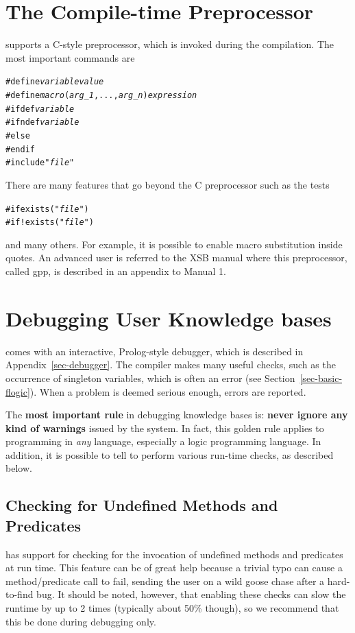 \documentclass[11pt]{article}
\newcommand{\ERGO}{\mbox{\smaller{\ensuremath{\cal{E}}\smaller{{\sc{RGO}}}}}\xspace}
\newcommand{\FLSYSTEM}{\ERGO}
\begin{document}
\section{The Compile-time Preprocessor}\label{sec-gpp}

\FLSYSTEM supports a C-style preprocessor, which is invoked during the
compilation. The most important commands are
\begin{alltt}
   #define \emph{variable} \emph{value} 
   #define \emph{macro}(\emph{arg_1},...,\emph{arg_n}) \emph{expression} 
   #ifdef \emph{variable} 
   #ifndef \emph{variable} 
   #else
   #endif
   #include "\emph{file}" 
\end{alltt}
There are many features that go beyond the C preprocessor such as the tests
\begin{alltt}
   #if exists("\emph{file}") 
   #if !exists("\emph{file}") 
\end{alltt}
and many others. For example, it is possible to enable macro substitution
inside quotes. An advanced user is referred to the XSB manual where this
preprocessor, called gpp, is described in an appendix to Manual 1.


\section{Debugging User Knowledge bases}\label{sec-debugging}

\FLSYSTEM comes with an interactive, Prolog-style debugger, which is described
in Appendix~\ref{sec-debugger}. The compiler makes many useful checks, such
as the occurrence of singleton variables, which is often an error (see
Section~\ref{sec-basic-flogic}). When a problem is deemed serious enough,
errors are reported.

The \textbf{most important rule}  
in debugging \FLSYSTEM knowledge bases is: \textbf{never
  ignore any kind of warnings} issued by the system. In fact, this golden rule 
applies to programming in \emph{any} language, especially  a logic programming
language.  In addition, it is possible
to tell \FLSYSTEM to perform various run-time checks, as described below.

\subsection{Checking for Undefined Methods and Predicates}\label{sec-undef}

\FLSYSTEM has support for checking for the invocation of undefined methods and
predicates at run time. This feature can be of great help because a trivial
typo can cause a method/predicate call to fail, sending the user on a
wild goose chase after a hard-to-find bug. It should be noted, however,
that enabling these checks can slow the runtime by up to 2 times (typically
about 50\% though), so we recommend that this be done during debugging only.
\end{document}
